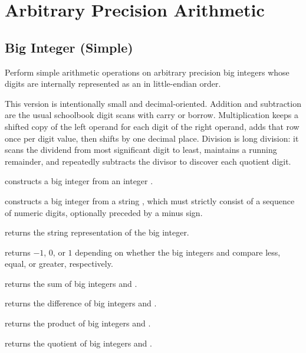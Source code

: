 \section{\texorpdfstring{Arbitrary Precision Arithmetic}{6.4 Arbitrary Precision Arithmetic}}
\setcounter{section}{4}
\setcounter{subsection}{0}
\subsection{Big Integer (Simple)}
\label{sec:6.4.1}
Perform simple arithmetic operations on arbitrary precision big integers whose digits are internally represented as an  in little-endian order.

This version is intentionally small and decimal-oriented. Addition and subtraction are the usual schoolbook digit scans with carry or borrow. Multiplication keeps a shifted copy of the left operand for each digit of the right operand, adds that row once per digit value, then shifts by one decimal place. Division is long division: it scans the dividend from most significant digit to least, maintains a running remainder, and repeatedly subtracts the divisor to discover each quotient digit.

\begin{compactitem}
  \item {} constructs a big integer from an integer .
  \item {} constructs a big integer from a string , which must strictly consist of a sequence of numeric digits, optionally preceded by a minus sign.
  \item {} returns the string representation of the big integer.
  \item {} returns $-1$, $0$, or $1$ depending on whether the big integers  and  compare less, equal, or greater, respectively.
  \item {} returns the sum of big integers  and .
  \item {} returns the difference of big integers  and .
  \item {} returns the product of big integers  and .
  \item {} returns the quotient of big integers  and .
\end{compactitem}

